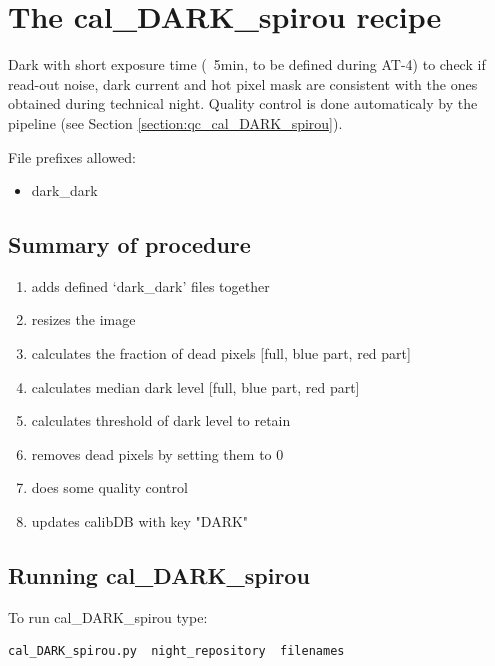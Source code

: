 \section{The cal\_DARK\_spirou recipe}
\label{section:cal_DARK_spirou}

Dark with short exposure time (~5min, to be defined during AT-4) to check if read-out noise, dark current and hot pixel mask are consistent with the ones obtained during technical night. Quality control is done automaticaly by the pipeline (see Section \ref{section:qc_cal_DARK_spirou}). \\


\noindent File prefixes allowed:
\begin{itemize}
	\item dark\_dark
\end{itemize}


\subsection{Summary of procedure}
\begin{enumerate}
\item adds defined `dark\_dark' files together
\item resizes the image
\item calculates the fraction of dead pixels [full, blue part, red part]
\item calculates median dark level [full, blue part, red part]
\item calculates threshold of dark level to retain
\item removes dead pixels by setting them to 0
\item does some quality control
\item updates calibDB with key "DARK"
\end{enumerate}

\subsection{Running cal\_DARK\_spirou}

To run cal\_DARK\_spirou type:
\begin{lstlisting}[language=bash, style=bashstyle]
cal_DARK_spirou.py  night_repository  filenames
\end{lstlisting}

